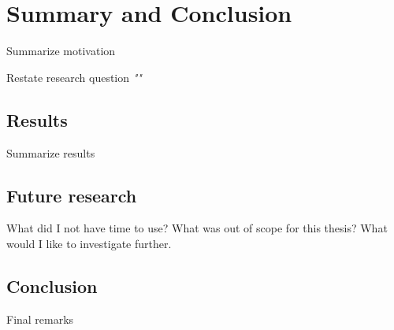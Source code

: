 \chapter{Summary and Conclusion} %
\label{Conclusion} %
Summarize motivation

Restate research question
\emph{""}

\section{Results}
Summarize results

\section{Future research}
What did I not have time to use? What was out of scope for this thesis? What would I like to investigate further.

\section{Conclusion}
Final remarks